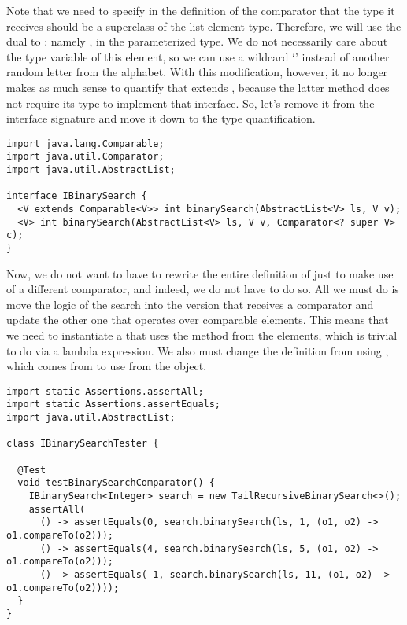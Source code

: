 Note that we need to specify in the definition of the comparator that the type it receives should be a superclass of the list element type. 
Therefore, we will use the dual to : namely , in the parameterized type.
We do not necessarily care about the type variable of this element, so we can use a wildcard `' instead of another random letter from the alphabet. 
With this modification, however, it no longer makes as much sense to quantify that  extends , because the latter method does not require its type to implement that interface. 
So, let's remove it from the interface signature and move it down to the type quantification.

\begin{lstlisting}[language=MyJava]
import java.lang.Comparable;
import java.util.Comparator;
import java.util.AbstractList;

interface IBinarySearch {
  <V extends Comparable<V>> int binarySearch(AbstractList<V> ls, V v);
  <V> int binarySearch(AbstractList<V> ls, V v, Comparator<? super V> c);
}
\end{lstlisting}

Now, we do not want to have to rewrite the entire definition of  just to make use of a different comparator, and indeed, we do not have to do so. 
All we must do is move the logic of the search into the version that receives a comparator and update the other one that operates over comparable elements. 
This means that we need to instantiate a  that uses the  method from the elements, which is trivial to do via a lambda expression. 
We also must change the definition from using , which comes from  to use  from the  object.

\begin{lstlisting}[language=MyJava]
import static Assertions.assertAll;
import static Assertions.assertEquals;
import java.util.AbstractList;

class IBinarySearchTester {

  @Test
  void testBinarySearchComparator() {
    IBinarySearch<Integer> search = new TailRecursiveBinarySearch<>();
    assertAll(
      () -> assertEquals(0, search.binarySearch(ls, 1, (o1, o2) -> o1.compareTo(o2)));
      () -> assertEquals(4, search.binarySearch(ls, 5, (o1, o2) -> o1.compareTo(o2)));
      () -> assertEquals(-1, search.binarySearch(ls, 11, (o1, o2) -> o1.compareTo(o2))));
  }
}
\end{lstlisting}

